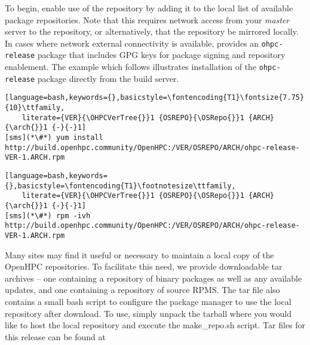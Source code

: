To begin, enable use of the \OHPC{} repository by adding it to the local list
of available package repositories. Note that this requires network access from
your {\em master} server to the \OHPC{} repository, or alternatively, that
the \OHPC{} repository be mirrored locally.  In cases where network external
connectivity is available, \OHPC{} provides an \texttt{ohpc-release} package
that includes GPG keys for package signing and repository enablement.  The
example which follows illustrates installation of the \texttt{ohpc-release}
package directly from the \OHPC{} build server.

\begin{lstlisting}[language=bash,keywords={},basicstyle=\fontencoding{T1}\fontsize{7.75}{10}\ttfamily,
	literate={VER}{\OHPCVerTree{}}1 {OSREPO}{\OSRepo{}}1 {ARCH}{\arch{}}1 {-}{-}1]
[sms](*\#*) yum install http://build.openhpc.community/OpenHPC:/VER/OSREPO/ARCH/ohpc-release-VER-1.ARCH.rpm
\end{lstlisting}
\else
\begin{lstlisting}[language=bash,keywords={},basicstyle=\fontencoding{T1}\footnotesize\ttfamily,
	literate={VER}{\OHPCVerTree{}}1 {OSREPO}{\OSRepo{}}1 {ARCH}{\arch{}}1 {-}{-}1]
[sms](*\#*) rpm -ivh http://build.openhpc.community/OpenHPC:/VER/OSREPO/ARCH/ohpc-release-VER-1.ARCH.rpm
\end{lstlisting}
\fi

\begin{center}
\begin{tcolorbox}[]
\small Many sites may find it useful or necessary to maintain a local copy of the
OpenHPC repositories. To facilitate this need, we provide downloadable tar
archives -- one containing a repository of binary packages as well as any
available updates, and one containing a repository of source RPMS. The tar file
also contains a small bash script to configure the package manager to use the
local repository after download. To use, simply unpack the tarball where you
would like to host the local repository and execute the make\_repo.sh script.
Tar files for this release can be found at \href{http://build.openhpc.community/dist/\OHPCVersion}
        {\color{blue}{http://build.openhpc.community/dist/\OHPCVersion}}
\end{tcolorbox}
\end{center}

